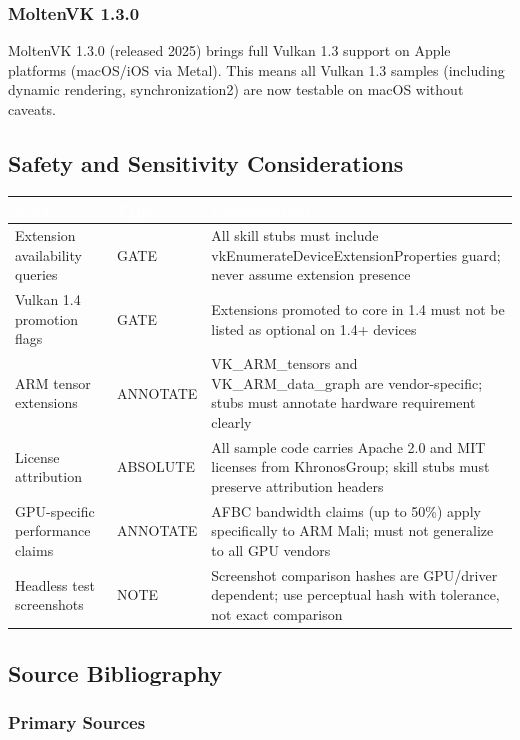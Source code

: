 \documentclass[11pt,letterpaper]{article}
\newcommand{\tableheader}[1]{\textbf{\sffamily\textcolor{white}{#1}}}
\begin{document}
\subsubsection{MoltenVK 1.3.0}

MoltenVK 1.3.0 (released 2025) brings full Vulkan 1.3 support on Apple platforms (macOS/iOS via Metal). This means all Vulkan 1.3 samples (including dynamic rendering, synchronization2) are now testable on macOS without caveats.

\subsection{Safety and Sensitivity Considerations}

\begin{center}
\begin{tabularx}{\textwidth}{L{4cm}C{2cm}X}
\toprule
{}
\tableheader{Area} & \tableheader{Type} & \tableheader{Consideration} \\
\midrule
Extension availability queries & GATE & All skill stubs must include vkEnumerateDeviceExtensionProperties guard; never assume extension presence \\
Vulkan 1.4 promotion flags & GATE & Extensions promoted to core in 1.4 must not be listed as optional on 1.4+ devices \\
ARM tensor extensions & ANNOTATE & VK\_ARM\_tensors and VK\_ARM\_data\_graph are vendor-specific; stubs must annotate hardware requirement clearly \\
License attribution & ABSOLUTE & All sample code carries Apache 2.0 and MIT licenses from KhronosGroup; skill stubs must preserve attribution headers \\
GPU-specific performance claims & ANNOTATE & AFBC bandwidth claims (up to 50\%) apply specifically to ARM Mali; must not generalize to all GPU vendors \\
Headless test screenshots & NOTE & Screenshot comparison hashes are GPU/driver dependent; use perceptual hash with tolerance, not exact comparison \\
\bottomrule
\end{tabularx}
\end{center}

\subsection{Source Bibliography}

\subsubsection{Primary Sources}
\end{document}
